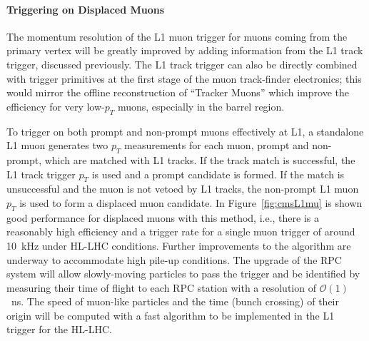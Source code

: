 \paragraph{Triggering on Displaced Muons}

The momentum resolution of the L1 muon trigger for muons coming from the primary vertex will be greatly improved by adding information from the L1 track trigger, discussed previously. The L1 track trigger can also be directly combined with trigger primitives at the first stage of the muon track-finder electronics; this would mirror the offline reconstruction of ``Tracker Muons'' which improve the efficiency for very low-$p_T$ muons, especially in the barrel region.

To trigger on both prompt and non-prompt muons effectively at L1, a standalone L1 muon generates two $p_T$ measurements for each muon, prompt and non-prompt, which are matched with L1 tracks. If the track match is successful, the L1 track trigger $p_T$ is used and a prompt candidate is formed. If the match is unsuccessful and the muon is not vetoed by L1 tracks, the non-prompt L1 muon $p_T$ is used to form a displaced muon candidate. In Figure~\ref{fig:cmsL1mu} is shown good performance for displaced muons with this method, i.e., there is a reasonably high efficiency and a trigger rate for a single muon trigger of around 10~kHz under HL-LHC conditions. Further improvements to the algorithm are underway to accommodate high pile-up conditions. The upgrade of the RPC system will allow slowly-moving particles to pass the trigger and be identified by measuring their time of flight to each RPC station with a resolution of $\mathcal{O}(1)$~ns. The speed of muon-like particles and the time (bunch crossing) of their
origin will be computed with a fast algorithm to be implemented in the L1 trigger for the HL-LHC.

